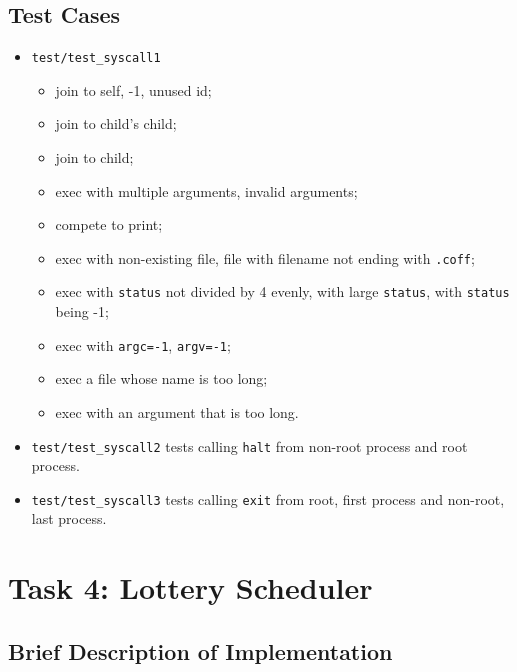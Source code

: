 \documentclass{article}
\begin{document}
\subsection{Test Cases}

\begin{itemize}
\item
\texttt{test/test\_syscall1}
	\begin{itemize}
	\item
	join to self, -1, unused id;
	\item
	join to child's child;
	\item
	join to child;
	\item
	exec with multiple arguments, invalid arguments;
	\item
	compete to print;
	\item
	exec with non-existing file, file with filename not ending with \texttt{.coff};
	\item
	exec with \texttt{status} not divided by 4 evenly, with large \texttt{status}, with \texttt{status} being -1;
	\item
	exec with \texttt{argc=-1}, \texttt{argv=-1};
	\item
	exec a file whose name is too long;
	\item
	exec with an argument that is too long.
	\end{itemize}


\item
\texttt{test/test\_syscall2} tests calling \texttt{halt} from non-root process and root process.

\item
\texttt{test/test\_syscall3} tests calling \texttt{exit} from root, first process and non-root, last process.

\end{itemize}

\section{Task 4: Lottery Scheduler}

\subsection{Brief Description of Implementation}
\end{document}
